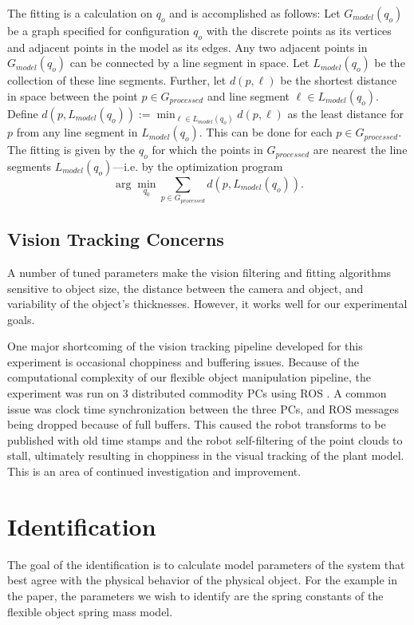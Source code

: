 \documentclass[runningheads,a4paper]{llncs}
\begin{document}
The fitting is a calculation on $q_o$ and is accomplished as follows: Let $G_{model}(q_o)$ be a graph specified for configuration $q_o$ with the discrete points as its vertices and adjacent points in the model as its edges. Any two adjacent points in $G_{model}(q_o)$ can be connected by a line segment in space. Let $L_{model}(q_o)$ be the collection of these line segments. Further, let $d(p,\ell)$ be the shortest distance in space between the point $p\in G_{processed}$ and line segment $\ell \in L_{model}(q_o)$. Define $d(p,L_{model}(q_o)) := \min_{\ell\in L_{model}(q_o)} d(p,\ell)$ as the least distance for $p$ from any line segment in $L_{model}(q_o)$. This can be done for each $p\in G_{processed}$. The fitting is given by the $q_o$ for which the points in $G_{processed}$ are nearest the line segments $L_{model}(q_o)$---i.e. by the optimization program
\begin{equation}
\arg \min_{q_0} \sum_{p\in G_{processed}} d(p,L_{model}(q_o)).
\label{eq-fit_prog}
\end{equation}

\subsection{Vision Tracking Concerns \label{sec-vis_disc}}

A number of tuned parameters make the vision filtering and fitting algorithms sensitive to object size, the distance between the camera and object, and variability of the object's thicknesses. However, it works well for our experimental goals.

One major shortcoming of the vision tracking pipeline developed for this experiment is occasional choppiness and buffering issues. Because of the computational complexity of our flexible object manipulation pipeline, the experiment was run on 3 distributed commodity PCs using ROS \cite{quigley2009ros}. A common issue was clock time synchronization between the three PCs, and ROS messages being dropped because of full buffers. This caused the robot transforms to be published with old time stamps and the robot self-filtering of the point clouds to stall, ultimately resulting in choppiness in the visual tracking of the plant model. This is an area of continued investigation and improvement. 

\section{Identification}
\label{sec-id}
The goal of the identification is to calculate model parameters of the system that best agree with the physical behavior of the physical object. For the example in the paper, the parameters we wish to identify are the spring constants of the flexible object spring mass model. 
\end{document}
